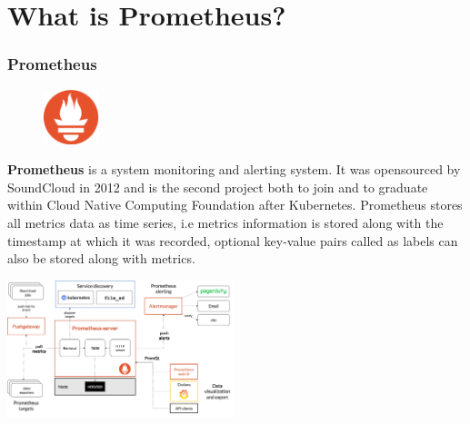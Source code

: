 \documentclass[compress]{beamer}
\begin{document}

\section{What is Prometheus?}

\begin{frame}
\frametitle{Prometheus}

\begin{figure}
\centering
\includegraphics[height=60px]{./images/example-image.png}
\end{figure}

\textbf{Prometheus} is a system monitoring and alerting system. It was opensourced by SoundCloud in 2012 and is the second project both to join and to graduate within Cloud Native Computing Foundation after Kubernetes. Prometheus stores all metrics data as time series, i.e metrics information is stored along with the timestamp at which it was recorded, optional key-value pairs called as labels can also be stored along with metrics.
\end{frame}


\begin{frame}
\begin{center}
\includegraphics[height=150px]{./images/architecture.png}
\end{center}
\end{frame}

\end{document}

